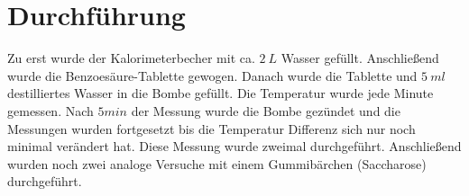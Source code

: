 \section{Durchführung}
	Zu erst wurde der Kalorimeterbecher mit ca. $2\ L$ Wasser gefüllt. Anschließend wurde die Benzoesäure-Tablette gewogen. Danach wurde die Tablette und $5\ ml$ destilliertes Wasser in die Bombe gefüllt. Die Temperatur wurde jede Minute gemessen. Nach $5 min$ der Messung wurde die Bombe gezündet und die Messungen wurden fortgesetzt bis die Temperatur Differenz sich nur noch minimal verändert hat. Diese Messung wurde zweimal durchgeführt. Anschließend wurden noch zwei analoge Versuche mit einem Gummibärchen (Saccharose) durchgeführt.
